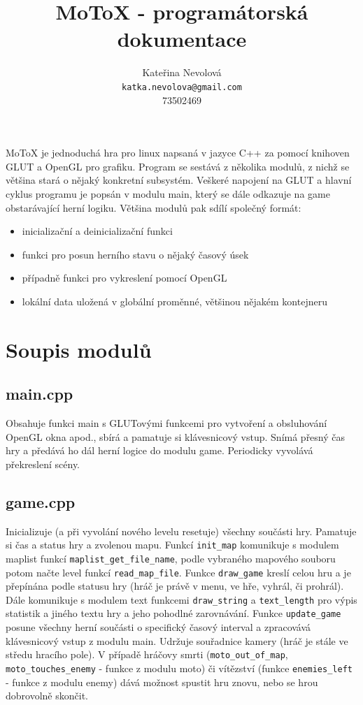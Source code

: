 \documentclass{article}
\title{MoToX - programátorská dokumentace}
\author{Kateřina Nevolová \\ \texttt{katka.nevolova@gmail.com} \\ 73502469}
\begin{document}
\maketitle

MoToX je jednoduchá hra pro linux napsaná v jazyce C++ za pomocí knihoven GLUT
a OpenGL pro grafiku. Program se sestává z několika modulů, z nichž se většina stará o nějaký konkretní subsystém. Veškeré napojení na GLUT a hlavní cyklus programu je popsán v modulu main, který se dále odkazuje na game obstarávající herní
logiku. Většina modulů pak sdílí společný formát:

\begin{itemize}
\item inicializační a deinicializační funkci
\item funkci pro posun herního stavu o nějaký časový úsek
\item případně funkci pro vykreslení pomocí OpenGL
\item lokální data uložená v globální proměnné, většinou nějakém kontejneru
\end{itemize}

\section{Soupis modulů}

\subsection{main.cpp}
Obsahuje funkci main s GLUTovými funkcemi pro vytvoření a obsluhování
OpenGL okna apod., sbírá a pamatuje si klávesnicový vstup. Snímá
přesný čas hry a předává ho dál herní logice do modulu game.
Periodicky vyvolává překreslení scény.

\subsection{game.cpp}
Inicializuje (a při vyvolání nového levelu resetuje) všechny součásti hry. Pamatuje si čas a status hry a zvolenou mapu. Funkcí \texttt{init\_map} komunikuje s modulem maplist funkcí \texttt{maplist\_get\_file\_name}, podle vybraného mapového souboru potom načte level funkcí \texttt{read\_map\_file}.
Funkce \texttt{draw\_game} kreslí celou hru a je přepínána podle statusu hry (hráč je právě v menu, ve hře, vyhrál, či prohrál). Dále komunikuje s modulem text funkcemi \texttt{draw\_string} a \texttt{text\_length} pro výpis statistik a jiného textu hry a jeho pohodlné zarovnávání. Funkce \texttt{update\_game} posune
všechny herní součásti o specifický časový interval a zpracovává
klávesnicový vstup z modulu main. Udržuje souřadnice kamery (hráč je stále ve středu hracího pole). V případě hráčovy smrti (\texttt{moto\_out\_of\_map}, \texttt{moto\_touches\_enemy} - funkce z modulu moto) či vítězství (funkce \texttt{enemies\_left} - funkce z modulu enemy) dává možnost spustit hru znovu, nebo se hrou dobrovolně skončit.
\end{document}
